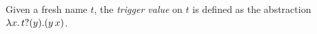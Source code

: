 \begin{definition}\label{d:trigger}
Given a fresh name $t$, the \emph{trigger value} on $t$ is defined as the abstraction
$\lambda {x}.\,t ? (y) . (y\, {{x}})$.
\end{definition}





